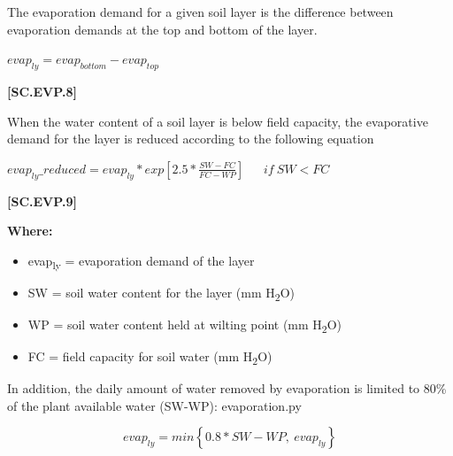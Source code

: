 The evaporation demand for a given soil layer is the difference between evaporation demands at the top and bottom of the layer. 
\vspace{0.5cm}

    \begin{center}
 \(evap_{ly}=evap_{bottom}-evap_{top}\)
    \end{center}
        \vspace{0.5cm} 
    
            {\raggedleft \textbf{[SC.EVP.8]}\par}
            \vspace{0.5cm}

When the water content of a soil layer is below field capacity, the
evaporative demand for the layer is reduced according to the following equation
\vspace{0.5cm}

    \begin{center}
 \(evap_{ly}\_reduced=evap_{ly} * exp[2.5 * \frac{SW-FC}{FC-WP}]\ \ \ \ \ \ \ if\ SW<FC\)
    \end{center}
        \vspace{0.5cm} 
    
            {\raggedleft \textbf{[SC.EVP.9]}\par}
            \vspace{0.5cm}

        \textbf{Where:}
            
        \begin{itemize}
            \item evap\textsubscript{ly}	=	evaporation demand of the layer
            \item SW	=	soil water content for the layer (mm H\textsubscript{2}O)
            \item WP	=	soil water content held at wilting point (mm H\textsubscript{2}O)
            \item FC	=	field capacity for soil water (mm H\textsubscript{2}O)
        \end{itemize}
    \vspace{0.2cm}

In addition, the daily amount of water removed by evaporation is limited to 80\% of the plant available water (SW-WP): evaporation.py
\vspace{0.5cm}

    \begin{center}

\[
evap_{ly} = min\left\{ 0.8 * SW-WP,\ evap_{ly} \right\}
\]

 
    \end{center}
        \vspace{0.5cm} 
    
